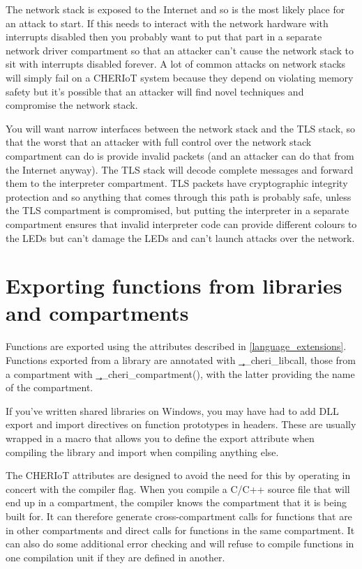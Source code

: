 The network stack is exposed to the Internet and so is the most likely place for an attack to start.
If this needs to interact with the network hardware with interrupts disabled then you probably want to put that part in a separate network driver compartment so that an attacker can't cause the network stack to sit with interrupts disabled forever.
A lot of common attacks on network stacks will simply fail on a CHERIoT system because they depend on violating memory safety but it's possible that an attacker will find novel techniques and compromise the network stack.

You will want narrow interfaces between the network stack and the TLS stack, so that the worst that an attacker with full control over the network stack compartment can do is provide invalid packets (and an attacker can do that from the Internet anyway).
The TLS stack will decode complete messages and forward them to the interpreter compartment.
TLS packets have cryptographic integrity protection and so anything that comes through this path is probably safe, unless the TLS compartment is compromised, but putting the interpreter in a separate compartment ensures that invalid interpreter code can provide different colours to the LEDs but can't damage the LEDs and can't launch attacks over the network.

\section[label=exporting_functions]{Exporting functions from libraries and compartments}

Functions are exported using the attributes described in \ref{language_extensions}.
Functions exported from a library are annotated with \c{__cheri_libcall}, those from a compartment with \c{__cheri_compartment()}, with the latter providing the name of the compartment.

If you've written shared libraries on Windows, you may have had to add DLL export and import directives on function prototypes in headers.
These are usually wrapped in a macro that allows you to define the export attribute when compiling the library and import when compiling anything else.

The CHERIoT attributes are designed to avoid the need for this by operating in concert with the  compiler flag.
When you compile a C/C++ source file that will end up in a compartment, the compiler knows the compartment that it is being built for.
It can therefore generate cross-compartment calls for functions that are in other compartments and direct calls for functions in the same compartment.
It can also do some additional error checking and will refuse to compile functions in one compilation unit if they are defined in another.

